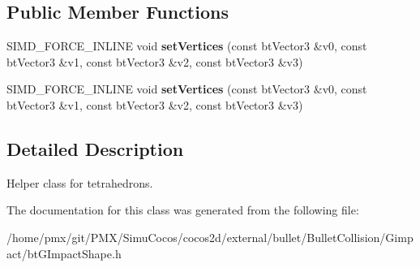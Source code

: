 \subsection*{Public Member Functions}
\begin{DoxyCompactItemize}
\item 
\mbox{\label{classbtTetrahedronShapeEx_aedc474fcbdbcae1d02e09547a7b67319}} 
S\+I\+M\+D\+\_\+\+F\+O\+R\+C\+E\+\_\+\+I\+N\+L\+I\+NE void {\bfseries set\+Vertices} (const bt\+Vector3 \&v0, const bt\+Vector3 \&v1, const bt\+Vector3 \&v2, const bt\+Vector3 \&v3)
\item 
\mbox{\label{classbtTetrahedronShapeEx_aedc474fcbdbcae1d02e09547a7b67319}} 
S\+I\+M\+D\+\_\+\+F\+O\+R\+C\+E\+\_\+\+I\+N\+L\+I\+NE void {\bfseries set\+Vertices} (const bt\+Vector3 \&v0, const bt\+Vector3 \&v1, const bt\+Vector3 \&v2, const bt\+Vector3 \&v3)
\end{DoxyCompactItemize}


\subsection{Detailed Description}
Helper class for tetrahedrons. 

The documentation for this class was generated from the following file\+:\begin{DoxyCompactItemize}
\item 
/home/pmx/git/\+P\+M\+X/\+Simu\+Cocos/cocos2d/external/bullet/\+Bullet\+Collision/\+Gimpact/bt\+G\+Impact\+Shape.\+h\end{DoxyCompactItemize}
